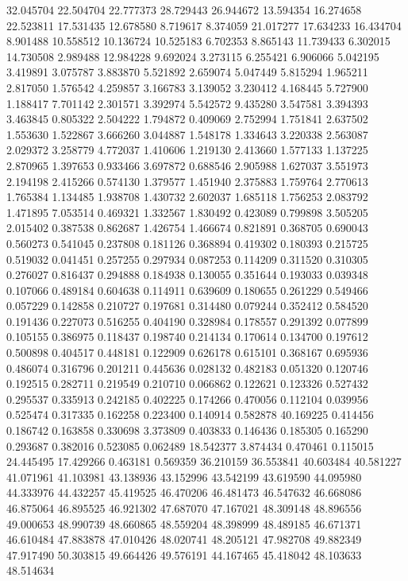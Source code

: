 32.045704
22.504704
22.777373
28.729443
26.944672
13.594354
16.274658
22.523811
17.531435
12.678580
8.719617
8.374059
21.017277
17.634233
16.434704
8.901488
10.558512
10.136724
10.525183
6.702353
8.865143
11.739433
6.302015
14.730508
2.989488
12.984228
9.692024
3.273115
6.255421
6.906066
5.042195
3.419891
3.075787
3.883870
5.521892
2.659074
5.047449
5.815294
1.965211
2.817050
1.576542
4.259857
3.166783
3.139052
3.230412
4.168445
5.727900
1.188417
7.701142
2.301571
3.392974
5.542572
9.435280
3.547581
3.394393
3.463845
0.805322
2.504222
1.794872
0.409069
2.752994
1.751841
2.637502
1.553630
1.522867
3.666260
3.044887
1.548178
1.334643
3.220338
2.563087
2.029372
3.258779
4.772037
1.410606
1.219130
2.413660
1.577133
1.137225
2.870965
1.397653
0.933466
3.697872
0.688546
2.905988
1.627037
3.551973
2.194198
2.415266
0.574130
1.379577
1.451940
2.375883
1.759764
2.770613
1.765384
1.134485
1.938708
1.430732
2.602037
1.685118
1.756253
2.083792
1.471895
7.053514
0.469321
1.332567
1.830492
0.423089
0.799898
3.505205
2.015402
0.387538
0.862687
1.426754
1.466674
0.821891
0.368705
0.690043
0.560273
0.541045
0.237808
0.181126
0.368894
0.419302
0.180393
0.215725
0.519032
0.041451
0.257255
0.297934
0.087253
0.114209
0.311520
0.310305
0.276027
0.816437
0.294888
0.184938
0.130055
0.351644
0.193033
0.039348
0.107066
0.489184
0.604638
0.114911
0.639609
0.180655
0.261229
0.549466
0.057229
0.142858
0.210727
0.197681
0.314480
0.079244
0.352412
0.584520
0.191436
0.227073
0.516255
0.404190
0.328984
0.178557
0.291392
0.077899
0.105155
0.386975
0.118437
0.198740
0.214134
0.170614
0.134700
0.197612
0.500898
0.404517
0.448181
0.122909
0.626178
0.615101
0.368167
0.695936
0.486074
0.316796
0.201211
0.445636
0.028132
0.482183
0.051320
0.120746
0.192515
0.282711
0.219549
0.210710
0.066862
0.122621
0.123326
0.527432
0.295537
0.335913
0.242185
0.402225
0.174266
0.470056
0.112104
0.039956
0.525474
0.317335
0.162258
0.223400
0.140914
0.582878
40.169225
0.414456
0.186742
0.163858
0.330698
3.373809
0.403833
0.146436
0.185305
0.165290
0.293687
0.382016
0.523085
0.062489
18.542377
3.874434
0.470461
0.115015
24.445495
17.429266
0.463181
0.569359
36.210159
36.553841
40.603484
40.581227
41.071961
41.103981
43.138936
43.152996
43.542199
43.619590
44.095980
44.333976
44.432257
45.419525
46.470206
46.481473
46.547632
46.668086
46.875064
46.895525
46.921302
47.687070
47.167021
48.309148
48.896556
49.000653
48.990739
48.660865
48.559204
48.398999
48.489185
46.671371
46.610484
47.883878
47.010426
48.020741
48.205121
47.982708
49.882349
47.917490
50.303815
49.664426
49.576191
44.167465
45.418042
48.103633
48.514634
